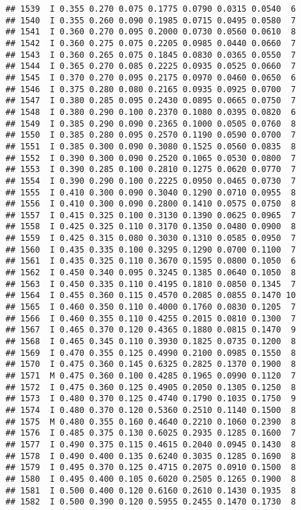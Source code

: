 \documentclass[
]{article}
\begin{document}
\begin{verbatim}
## 1539  I 0.355 0.270 0.075 0.1775 0.0790 0.0315 0.0540  6
## 1540  I 0.355 0.260 0.090 0.1985 0.0715 0.0495 0.0580  7
## 1541  I 0.360 0.270 0.095 0.2000 0.0730 0.0560 0.0610  8
## 1542  I 0.360 0.275 0.075 0.2205 0.0985 0.0440 0.0660  7
## 1543  I 0.360 0.265 0.075 0.1845 0.0830 0.0365 0.0550  7
## 1544  I 0.365 0.270 0.085 0.2225 0.0935 0.0525 0.0660  7
## 1545  I 0.370 0.270 0.095 0.2175 0.0970 0.0460 0.0650  6
## 1546  I 0.375 0.280 0.080 0.2165 0.0935 0.0925 0.0700  7
## 1547  I 0.380 0.285 0.095 0.2430 0.0895 0.0665 0.0750  7
## 1548  I 0.380 0.290 0.100 0.2370 0.1080 0.0395 0.0820  6
## 1549  I 0.385 0.290 0.090 0.2365 0.1000 0.0505 0.0760  8
## 1550  I 0.385 0.280 0.095 0.2570 0.1190 0.0590 0.0700  7
## 1551  I 0.385 0.300 0.090 0.3080 0.1525 0.0560 0.0835  8
## 1552  I 0.390 0.300 0.090 0.2520 0.1065 0.0530 0.0800  7
## 1553  I 0.390 0.285 0.100 0.2810 0.1275 0.0620 0.0770  7
## 1554  I 0.390 0.290 0.100 0.2225 0.0950 0.0465 0.0730  7
## 1555  I 0.410 0.300 0.090 0.3040 0.1290 0.0710 0.0955  8
## 1556  I 0.410 0.300 0.090 0.2800 0.1410 0.0575 0.0750  8
## 1557  I 0.415 0.325 0.100 0.3130 0.1390 0.0625 0.0965  7
## 1558  I 0.425 0.325 0.110 0.3170 0.1350 0.0480 0.0900  8
## 1559  I 0.425 0.315 0.080 0.3030 0.1310 0.0585 0.0950  7
## 1560  I 0.435 0.335 0.100 0.3295 0.1290 0.0700 0.1100  7
## 1561  I 0.435 0.325 0.110 0.3670 0.1595 0.0800 0.1050  6
## 1562  I 0.450 0.340 0.095 0.3245 0.1385 0.0640 0.1050  8
## 1563  I 0.450 0.335 0.110 0.4195 0.1810 0.0850 0.1345  7
## 1564  I 0.455 0.360 0.115 0.4570 0.2085 0.0855 0.1470 10
## 1565  I 0.460 0.350 0.110 0.4000 0.1760 0.0830 0.1205  7
## 1566  I 0.460 0.355 0.110 0.4255 0.2015 0.0810 0.1300  7
## 1567  I 0.465 0.370 0.120 0.4365 0.1880 0.0815 0.1470  9
## 1568  I 0.465 0.345 0.110 0.3930 0.1825 0.0735 0.1200  8
## 1569  I 0.470 0.355 0.125 0.4990 0.2100 0.0985 0.1550  8
## 1570  I 0.475 0.360 0.145 0.6325 0.2825 0.1370 0.1900  8
## 1571  M 0.475 0.360 0.100 0.4285 0.1965 0.0990 0.1120  7
## 1572  I 0.475 0.360 0.125 0.4905 0.2050 0.1305 0.1250  8
## 1573  I 0.480 0.370 0.125 0.4740 0.1790 0.1035 0.1750  9
## 1574  I 0.480 0.370 0.120 0.5360 0.2510 0.1140 0.1500  8
## 1575  M 0.480 0.355 0.160 0.4640 0.2210 0.1060 0.2390  8
## 1576  I 0.485 0.375 0.130 0.6025 0.2935 0.1285 0.1600  7
## 1577  I 0.490 0.375 0.115 0.4615 0.2040 0.0945 0.1430  8
## 1578  I 0.490 0.400 0.135 0.6240 0.3035 0.1285 0.1690  8
## 1579  I 0.495 0.370 0.125 0.4715 0.2075 0.0910 0.1500  8
## 1580  I 0.495 0.400 0.105 0.6020 0.2505 0.1265 0.1900  8
## 1581  I 0.500 0.400 0.120 0.6160 0.2610 0.1430 0.1935  8
## 1582  I 0.500 0.390 0.120 0.5955 0.2455 0.1470 0.1730  8

\end{verbatim}
\end{document}
